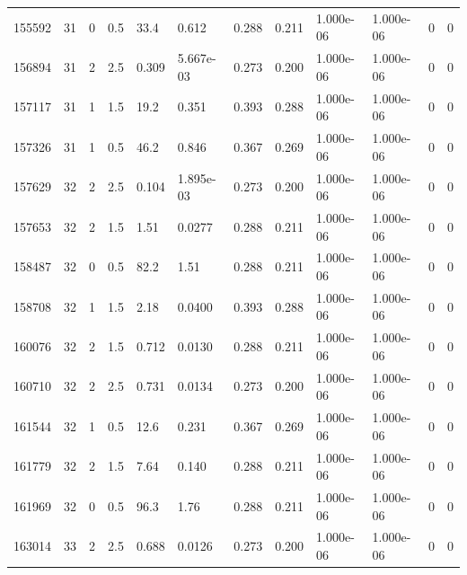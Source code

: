 \documentclass[preview]{standalone}
\begin{document}
{{{{{{{\begin{tabular}{L{1.2cm}C{1.2cm} C{0.3cm}C{0.5cm} C{1.4cm}C{1.4cm} C{1.4cm}C{1.4cm} C{1.6cm}C{1.6cm} C{1.6cm}C{1.6cm}}
  155592  &    31  & 0     & 0.5 &  33.4  & 0.612  &  0.288&   0.211& 1.000e-06 & 1.000e-06   &  0 & 0  \\ 
  156894  &    31  & 2     & 2.5 &  0.309  & 5.667e-03  &  0.273&   0.200& 1.000e-06 & 1.000e-06   &  0 & 0  \\ 
  157117  &    31  & 1     & 1.5 &  19.2  & 0.351  &  0.393&   0.288& 1.000e-06 & 1.000e-06   &  0 & 0  \\ 
  157326  &    31  & 1     & 0.5 &  46.2  & 0.846  &  0.367&   0.269& 1.000e-06 & 1.000e-06   &  0 & 0  \\ 
  157629  &    32  & 2     & 2.5 &  0.104  & 1.895e-03  &  0.273&   0.200& 1.000e-06 & 1.000e-06   &  0 & 0  \\ 
  157653  &    32  & 2     & 1.5 &  1.51  & 0.0277  &  0.288&   0.211& 1.000e-06 & 1.000e-06   &  0 & 0  \\ 
  158487  &    32  & 0     & 0.5 &  82.2  & 1.51  &  0.288&   0.211& 1.000e-06 & 1.000e-06   &  0 & 0  \\ 
  158708  &    32  & 1     & 1.5 &  2.18  & 0.0400  &  0.393&   0.288& 1.000e-06 & 1.000e-06   &  0 & 0  \\ 
  160076  &    32  & 2     & 1.5 &  0.712  & 0.0130  &  0.288&   0.211& 1.000e-06 & 1.000e-06   &  0 & 0  \\ 
  160710  &    32  & 2     & 2.5 &  0.731  & 0.0134  &  0.273&   0.200& 1.000e-06 & 1.000e-06   &  0 & 0  \\ 
  161544  &    32  & 1     & 0.5 &  12.6  & 0.231  &  0.367&   0.269& 1.000e-06 & 1.000e-06   &  0 & 0  \\ 
  161779  &    32  & 2     & 1.5 &  7.64  & 0.140  &  0.288&   0.211& 1.000e-06 & 1.000e-06   &  0 & 0  \\ 
  161969  &    32  & 0     & 0.5 &  96.3  & 1.76  &  0.288&   0.211& 1.000e-06 & 1.000e-06   &  0 & 0  \\ 
  163014  &    33  & 2     & 2.5 &  0.688  & 0.0126  &  0.273&   0.200& 1.000e-06 & 1.000e-06   &  0 & 0  \\ 
\hline 
\end{tabular} 

}}}}}}}
\end{document}
